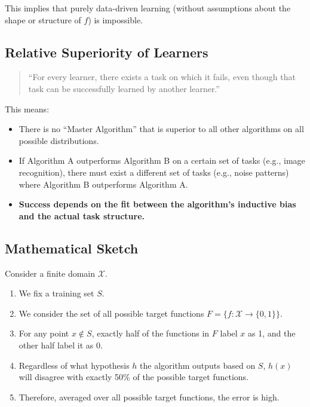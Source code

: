 \documentclass[
  italian,
  11pt,
]{article}
\providecommand{\tightlist}{%
  \setlength{\itemsep}{0pt}\setlength{\parskip}{0pt}}
\begin{document}
This implies that purely data-driven learning (without assumptions about
the shape or structure of \(f\)) is impossible.

\subsection{Relative Superiority of
Learners}\label{relative-superiority-of-learners}

\begin{quote}
``For every learner, there exists a task on which it fails, even though
that task can be successfully learned by another learner.''
\end{quote}

This means:

\begin{itemize}
\tightlist
\item
  There is no ``Master Algorithm'' that is superior to all other
  algorithms on all possible distributions.
\item
  If Algorithm A outperforms Algorithm B on a certain set of tasks
  (e.g., image recognition), there must exist a different set of tasks
  (e.g., noise patterns) where Algorithm B outperforms Algorithm A.
\item
  \textbf{Success depends on the fit between the algorithm's inductive
  bias and the actual task structure.}
\end{itemize}

\subsection{Mathematical Sketch}\label{mathematical-sketch}

Consider a finite domain \(\mathcal{X}\).

\begin{enumerate}
\def\labelenumi{\arabic{enumi}.}
\tightlist
\item
  We fix a training set \(S\).
\item
  We consider the set of all possible target functions
  \(F = \{f : \mathcal{X} \to \{0,1\}\}\).
\item
  For any point \(x \notin S\), exactly half of the functions in \(F\)
  label \(x\) as 1, and the other half label it as 0.
\item
  Regardless of what hypothesis \(h\) the algorithm outputs based on
  \(S\), \(h(x)\) will disagree with exactly 50\% of the possible target
  functions.
\item
  Therefore, averaged over all possible target functions, the error is
  high.
\end{enumerate}
\end{document}
